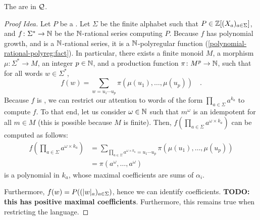 \documentclass[a4paper,11pt]{article}
\begin{document}
\begin{lemma}
    The  are in $\mathcal{Q}$.
\end{lemma}
\begin{proof}[Proof Idea]
    Let $P$ be a .
    Let $\Sigma$  be the finite alphabet such that
    $P \in \mathbb{Z}[(X_a)_{a \in \Sigma}]$,
    and $f \colon \Sigma^* \to \mathbb{N}$ be the 
    $\mathbb{N}$-rational series computing $P$.
    Because $f$ has polynomial growth, and is a $\mathbb{N}$-rational series,
    it is a $\mathbb{N}$-polyregular function 
    (\cref{polynomial-rational-polyreg:fact}).
    In particular, 
    there exists a finite monoid $M$,
    a morphism $\mu \colon \Sigma^* \to M$,
    an integer $p  \in \mathbb{N}$,
    and a production function $\pi \colon M^p \to \mathbb{N}$,
    such that for all words $w \in \Sigma^*$,
    \begin{equation*}
        f(w) = \sum_{w = u_1 \cdots u_p} \pi(\mu(u_1), \dots, \mu(u_p)) \quad .
    \end{equation*}
    Because $f$ is , we can restrict our attention
    to words of the form $\prod_{a \in \Sigma} a^{k_a}$ to compute $f$.
    To that end, let us
    consider $\omega \in \mathbb{N}$ such that
    $m^\omega$ is an idempotent for all $m \in M$ (this is possible because
    $M$ is finite).
    Then, $f( \prod_{a \in \Sigma} a^{ \omega \times k_a} )$
    can be computed as follows:
    \begin{align*}
    f(\prod_{a \in \Sigma} a^{ \omega \times k_a} )
    &= 
    \sum_{\prod_{a \in \Sigma} a^{\omega \times k_a}
    = u_1 \cdots u_p} 
         \pi(\mu(u_1), \dots, \mu(u_p)) \\
    &= \pi(a^\omega, \dots, a^\omega) 
    \end{align*}
    is a polynomial in $k_a$, whose maximal coefficients are
    sums of $\alpha_i$. 

    Furthermore, $f(w) = P(\seqof{\card[a]{w}}{a \in \Sigma})$,
    hence we can identify coefficients.
    \textbf{TODO: this has positive maximal coefficients}.
    Furthermore, this remains true when restricting the language.
\end{proof}
\end{document}
